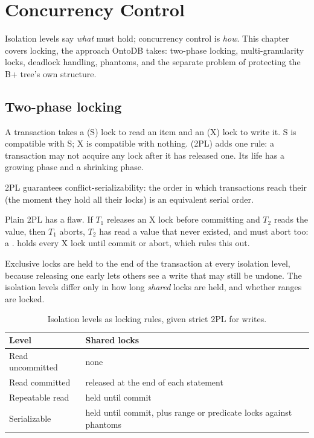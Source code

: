 \chapter{Concurrency Control}
\label{ch:concurrency}

Isolation levels say \emph{what} must hold; concurrency control is \emph{how}.
This chapter covers locking, the approach OntoDB takes: two-phase locking,
multi-granularity locks, deadlock handling, phantoms, and the separate problem
of protecting the B+ tree's own structure.

\section{Two-phase locking}

A transaction takes a  (S) lock to read an item and an
 (X) lock to write it. S is compatible with S; X is compatible
with nothing.  (2PL) adds one rule: a transaction may
not acquire any lock after it has released one. Its life has a growing phase
and a shrinking phase.

2PL guarantees conflict-serializability: the order in which transactions reach
their  (the moment they hold all their locks) is an equivalent
serial order.

Plain 2PL has a flaw. If $T_1$ releases an X lock before committing and $T_2$
reads the value, then $T_1$ aborts, $T_2$ has read a value that never existed,
and must abort too: a .  holds every
X lock until commit or abort, which rules this out.

\begin{keyidea}
Exclusive locks are held to the end of the transaction at every isolation
level, because releasing one early lets others see a write that may still be
undone. The isolation levels differ only in how long \emph{shared} locks are
held, and whether ranges are locked.
\end{keyidea}

\begin{table}[ht]
\centering
\begin{tabular}{@{}ll@{}}
\toprule
Level & Shared locks \\
\midrule
Read uncommitted & none \\
Read committed & released at the end of each statement \\
Repeatable read & held until commit \\
Serializable & held until commit, plus range or predicate locks against phantoms \\
\bottomrule
\end{tabular}
\caption{Isolation levels as locking rules, given strict 2PL for writes.}
\end{table}

